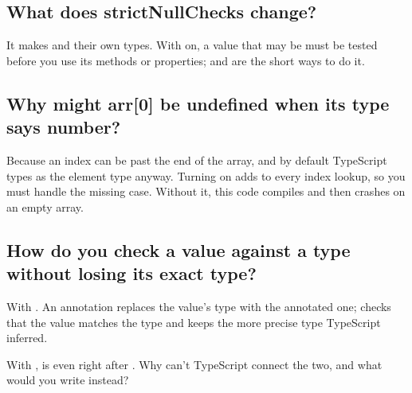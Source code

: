 \label{ch:c25}

\subsection{What does strictNullChecks change?}%
It makes  and  their own types. With  on, a value that may be  must be tested before you use its methods or properties;  and  are the short ways to do it.

\subsection{Why might arr[0] be undefined when its type says number?}%
Because an index can be past the end of the array, and by default TypeScript types  as the element type anyway. Turning on  adds  to every index lookup, so you must handle the missing case. Without it, this code compiles and then crashes on an empty array.

\subsection{How do you check a value against a type without losing its exact type?}%
With . An annotation replaces the value's type with the annotated one;  checks that the value matches the type and keeps the more precise type TypeScript inferred.

\begin{ponder}With ,  is  even right after . Why can't TypeScript connect the two, and what would you write instead?\end{ponder}
